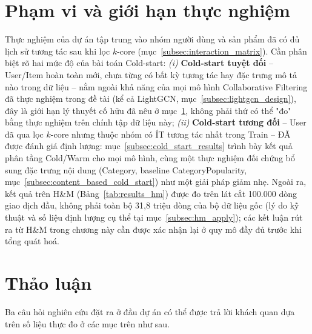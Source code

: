 \section{Phạm vi và giới hạn thực nghiệm}
\label{sec:pham_vi_thuc_nghiem}

Thực nghiệm của dự án tập trung vào nhóm người dùng và sản phẩm đã có đủ lịch sử tương tác sau khi lọc $k$-core (mục~\ref{subsec:interaction_matrix}). Cần phân biệt rõ hai mức độ của bài toán Cold-start: \textit{(i)} \textbf{Cold-start tuyệt đối} -- User/Item hoàn toàn mới, chưa từng có bất kỳ tương tác hay đặc trưng mô tả nào trong dữ liệu -- nằm ngoài khả năng của mọi mô hình Collaborative Filtering đã thực nghiệm trong đề tài (kể cả LightGCN, mục~\ref{subsec:lightgcn_design}), đây là giới hạn lý thuyết cố hữu đã nêu ở mục~\ref{sec:pham_vi_thuc_nghiem}, không phải thứ có thể "đo" bằng thực nghiệm trên chính tập dữ liệu này; \textit{(ii)} \textbf{Cold-start tương đối} -- User đã qua lọc $k$-core nhưng thuộc nhóm có ÍT tương tác nhất trong Train -- ĐÃ được đánh giá định lượng: mục~\ref{subsec:cold_start_results} trình bày kết quả phân tầng Cold/Warm cho mọi mô hình, cùng một thực nghiệm đối chứng bổ sung đặc trưng nội dung (Category, baseline CategoryPopularity, mục~\ref{subsec:content_based_cold_start}) như một giải pháp giảm nhẹ. Ngoài ra, kết quả trên H\&M (Bảng~\ref{tab:results_hm}) được đo trên lát cắt 100.000 dòng giao dịch đầu, không phải toàn bộ 31,8 triệu dòng của bộ dữ liệu gốc (lý do kỹ thuật và số liệu định lượng cụ thể tại mục~\ref{subsec:hm_apply}); các kết luận rút ra từ H\&M trong chương này cần được xác nhận lại ở quy mô đầy đủ trước khi tổng quát hoá.

\section{Thảo luận}
\label{sec:discussion}

Ba câu hỏi nghiên cứu đặt ra ở đầu dự án có thể được trả lời khách quan dựa trên số liệu thực đo ở các mục trên như sau.

